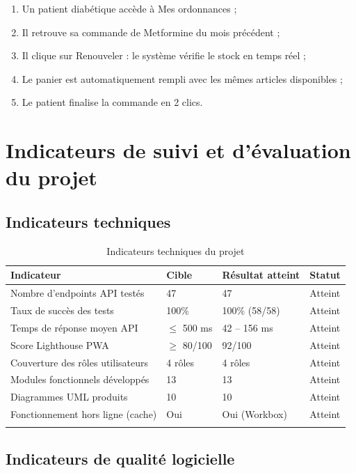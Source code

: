\documentclass[12pt,a4paper,oneside]{report}
\begin{document}
\begin{enumerate}
  \item Un patient diabétique accède à \og{}Mes ordonnances\fg{} ;
  \item Il retrouve sa commande de Metformine du mois précédent ;
  \item Il clique sur \og{}Renouveler\fg{} : le système vérifie le stock en temps réel ;
  \item Le panier est automatiquement rempli avec les mêmes articles disponibles ;
  \item Le patient finalise la commande en 2 clics.
\end{enumerate}

\section{Indicateurs de suivi et d'évaluation du projet}

\subsection{Indicateurs techniques}

\begin{longtable}{L{5cm}L{3cm}L{3cm}L{3cm}}
  \toprule
  \textbf{Indicateur} & \textbf{Cible} & \textbf{Résultat atteint} & \textbf{Statut} \\
  \midrule
  Nombre d'endpoints API testés & 47 & 47 & Atteint \\
  Taux de succès des tests & 100\% & 100\% (58/58) & Atteint \\
  Temps de réponse moyen API & $\leq$ 500 ms & 42 -- 156 ms & Atteint \\
  Score Lighthouse PWA & $\geq$ 80/100 & 92/100 & Atteint \\
  Couverture des rôles utilisateurs & 4 rôles & 4 rôles & Atteint \\
  Modules fonctionnels développés & 13 & 13 & Atteint \\
  Diagrammes UML produits & 10 & 10 & Atteint \\
  Fonctionnement hors ligne (cache) & Oui & Oui (Workbox) & Atteint \\
  \bottomrule
  \caption{Indicateurs techniques du projet}
\end{longtable}

\subsection{Indicateurs de qualité logicielle}
\end{document}
